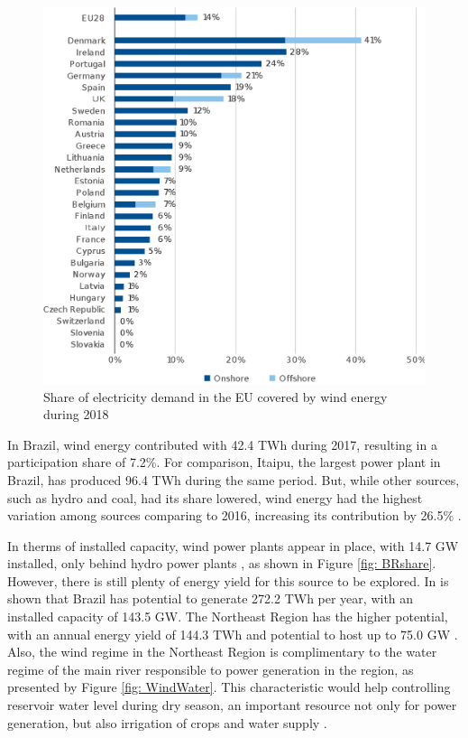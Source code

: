\begin{figure}[h]
	\caption{Share of electricity demand in the EU covered by wind energy during 2018}
	\begin{center}
		\includegraphics[scale=0.65]{Images/EUrank.eps}
	\end{center}
	\label{fig: EUrank}
\end{figure}

In Brazil, wind energy contributed with 42.4 TWh during 2017, resulting in a participation share of 7.2\%. For comparison, Itaipu, the largest power plant in Brazil, has produced 96.4 TWh during the same period. But, while other sources, such as hydro and coal, had its share lowered, wind energy had the highest variation among sources comparing to 2016, increasing its contribution by 26.5\% \cite{EPE2018}. 

In therms of installed capacity, wind power plants appear in  place, with 14.7 GW installed, only behind hydro power plants \cite{ABEEolica2018}, as shown in Figure \ref{fig: BRshare}. However, there is still plenty of energy yield for this source to be explored. In \cite{Atlas2001} is shown that Brazil has potential to generate 272.2 TWh per year, with an installed capacity of 143.5 GW. The Northeast Region has the higher potential, with an annual energy yield of 144.3 TWh and potential to host up to 75.0 GW . Also, the wind regime in the Northeast Region is complimentary to the water regime of the main river responsible to power generation in the region, as presented by Figure \ref{fig: WindWater}. This characteristic would help controlling reservoir water level during dry season, an important resource not only for power generation, but also irrigation of crops and water supply \cite{ANEEL2005}.

